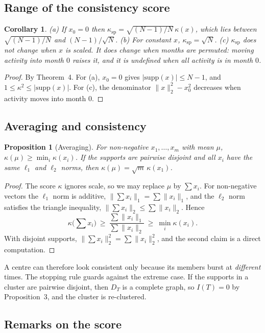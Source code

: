 \documentclass[11pt]{article}
\newcommand{\supp}{\mathrm{supp}}
\newcommand{\norm}[1]{\lVert #1 \rVert}
\newtheorem{corollary}{Corollary}\renewcommand{\thecorollary}{S\arabic{corollary}}
\newtheorem{proposition}{Proposition}\renewcommand{\theproposition}{S\arabic{proposition}}
\theoremstyle{remark}\newtheorem{remark}{Remark}\renewcommand{\theremark}{S\arabic{remark}}
\begin{document}
\subsection*{Range of the consistency score}
\begin{corollary}\label{cor:bounds}
(a) If $x_0=0$ then $\kappa_{\mathrm{sp}}=\sqrt{(N-1)/N}\,\kappa(x)$, which lies between $\sqrt{(N-1)/N}$ and $(N-1)/\sqrt N$.
(b) For constant $x$, $\kappa_{\mathrm{sp}}=\sqrt N$.
(c) $\kappa_{\mathrm{sp}}$ does not change when $x$ is scaled. It does change when months are permuted: moving activity into month $0$ raises it, and it is undefined when all activity is in month $0$.
\end{corollary}
\begin{proof}
By Theorem~4. For (a), $x_0=0$ gives $|\supp(x)|\le N-1$, and $1\le\kappa^2\le|\supp(x)|$. For (c), the denominator $\norm{x}_2^2-x_0^2$ decreases when activity moves into month $0$.
\end{proof}

\subsection*{Averaging and consistency}
\begin{proposition}[Averaging]\label{prop:avg}
For non-negative $x_1,\dots,x_m$ with mean $\mu$, $\kappa(\mu)\ge\min_i\kappa(x_i)$. If the supports are pairwise disjoint and all $x_i$ have the same $\ell_1$ and $\ell_2$ norms, then $\kappa(\mu)=\sqrt m\,\kappa(x_1)$.
\end{proposition}
\begin{proof}
The score $\kappa$ ignores scale, so we may replace $\mu$ by $\sum x_i$. For non-negative vectors the $\ell_1$ norm is additive, $\norm{\sum x_i}_1=\sum\norm{x_i}_1$, and the $\ell_2$ norm satisfies the triangle inequality, $\norm{\sum x_i}_2\le\sum\norm{x_i}_2$. Hence
\[ \kappa\big(\textstyle\sum x_i\big)\ \ge\ \frac{\sum\norm{x_i}_1}{\sum\norm{x_i}_2}\ \ge\ \min_i\kappa(x_i). \] With disjoint supports, $\norm{\sum x_i}_2^2=\sum\norm{x_i}_2^2$, and the second claim is a direct computation.
\end{proof}
A centre can therefore look consistent only because its members burst at \emph{different} times. The stopping rule guards against the extreme case. If the supports in a cluster are pairwise disjoint, then $D_T$ is a complete graph, so $I(T)=0$ by Proposition~3, and the cluster is re-clustered.

\subsection*{Remarks on the score}
\end{document}
